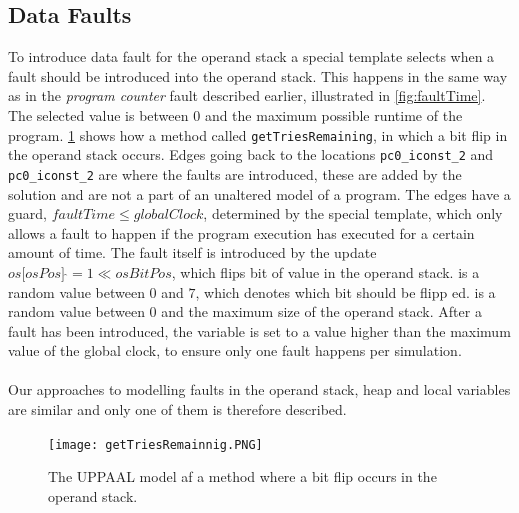 \subsection{Data Faults}
To introduce data fault for the operand stack a special template selects when a fault should be introduced into the operand stack. 
This happens in the same way as in the \textit{program counter} fault described earlier, illustrated in \cref{fig:faultTime}. 
The selected value is between $0$ and the maximum possible runtime of the program.
\cref{fig:opstackFlip} shows how a method called \texttt{getTriesRemaining}, in which a bit flip in the operand stack occurs.
Edges going back to the locations \texttt{pc0\_iconst\_2} and \texttt{pc0\_iconst\_2} are where the faults are introduced, these are added by the solution and are not a part of an unaltered model of a program. 
The edges have a guard, $faultTime \leq globalClock$, determined by the special template, which only allows a fault to happen if the program execution has executed for a certain amount of time. 
The fault itself is introduced by the update $os\lbrack osPos \rbrack\:\hat{}= 1 \ll osBitPos$, which flips bit  of value  in the operand stack.
 is a random value between $0$ and $7$, which denotes which bit should be flipp
ed.  is a random value between $0$ and the maximum size of the operand stack. 
After a fault has been introduced, the variable  is set to a value higher than the maximum value of the global clock, to ensure only one fault happens per simulation.\\\\
Our approaches to modelling faults in the operand stack, heap and local variables are similar and only one of them is therefore described.
\begin{figure}[H]
\centering
\texttt{[image: getTriesRemainnig.PNG]}
\caption{The UPPAAL model af a method where a bit flip occurs in the operand stack.}
\label{fig:opstackFlip}
\end{figure}

